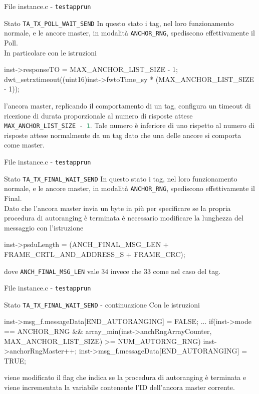 \begin{frame}[fragile, shrink=10]{File instance.c - \lstinline[language=C]!testapprun!}
  \begin{block}{Stato \lstinline[language=C]!TA_TX_POLL_WAIT_SEND!}
    In questo stato i tag, nel loro funzionamento normale, e le ancore master, in modalità
    \lstinline[language=C]!ANCHOR_RNG!, spediscono effettivamente il Poll.\\
    In particolare con le istruzioni
    \begin{C}
      inst->responseTO = MAX_ANCHOR_LIST_SIZE - 1;
      dwt_setrxtimeout((uint16)inst->fwtoTime_sy * (MAX_ANCHOR_LIST_SIZE - 1));
    \end{C}
    l'ancora master, replicando il comportamento di un tag, configura un timeout di ricezione
    di durata proporzionale al numero di risposte attese \lstinline[language=C]!MAX_ANCHOR_LIST_SIZE - 1!.
    Tale numero è inferiore di uno rispetto al numero di risposte attese normalmente da un tag
    dato che una delle ancore si comporta come master.
  \end{block}
\end{frame}

\begin{frame}[fragile]{File instance.c - \lstinline[language=C]!testapprun!}
  \begin{block}{Stato \lstinline[language=C]!TA_TX_FINAL_WAIT_SEND!}
    In questo stato i tag, nel loro funzionamento normale, e le ancore master, in modalità
    \lstinline[language=C]!ANCHOR_RNG!, spediscono effettivamente il Final.\\
    Dato che l'ancora master invia un byte in più per specificare se la \alert{propria} procedura di autoranging
    è terminata è necessario modificare la lunghezza del messaggio con l'istruzione
    \begin{C}
      inst->psduLength = (ANCH_FINAL_MSG_LEN + FRAME_CRTL_AND_ADDRESS_S + FRAME_CRC);
    \end{C}
    dove \lstinline[language=C]!ANCH_FINAL_MSG_LEN! vale $34$ invece che $33$ come nel caso del tag.\\
  \end{block}
\end{frame}

\begin{frame}[fragile]{File instance.c - \lstinline[language=C]!testapprun!}
  \begin{block}{Stato \lstinline[language=C]!TA_TX_FINAL_WAIT_SEND! - continuazione}
    Con le istruzioni
    \begin{C}
      inst->msg_f.messageData[END_AUTORANGING] = FALSE;
      ...
      if(inst->mode == ANCHOR_RNG && 
      array_min(inst->anchRngArrayCounter, MAX_ANCHOR_LIST_SIZE) >= NUM_AUTORNG_RNG)
      {
        inst->anchorRngMaster++;
        inst->msg_f.messageData[END_AUTORANGING] = TRUE;
      }
    \end{C}
    viene modificato il flag che indica se la procedura di autoranging è terminata e viene
    incrementata la variabile contenente l'ID dell'ancora master corrente.
  \end{block}
\end{frame}


